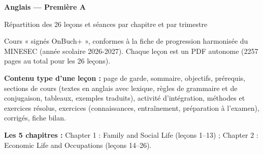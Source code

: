 \documentclass[11pt,a4paper]{article}
\begin{document}
{\LARGE\bfseries Anglais — Première A\par}\smallskip
{\large Répartition des 26 leçons et séances par chapitre et par trimestre\par}\medskip
Cours « signés OnBuch+ », conformes à la fiche de progression harmonisée du MINESEC (année scolaire 2026-2027). Chaque leçon est un PDF autonome (2257 pages au total pour les 26 leçons).\par\medskip
\textbf{Contenu type d'une leçon :} page de garde, sommaire, objectifs, prérequis, sections de cours (textes en anglais avec lexique, règles de grammaire et de conjugaison, tableaux, exemples traduits), activité d'intégration, méthodes et exercices résolus, exercices (connaissances, entraînement, préparation à l'examen), corrigés, fiche bilan.\par\medskip
\textbf{Les 5 chapitres :} Chapter 1 : Family and Social Life (leçons 1--13) ; Chapter 2 : Economic Life and Occupations (leçons 14--26).\par\bigskip
\end{document}
